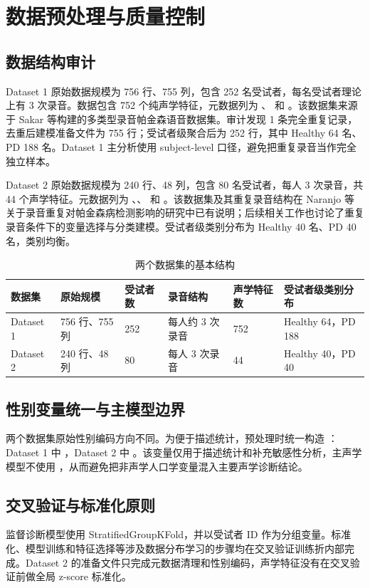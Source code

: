 \section{数据预处理与质量控制}

\subsection{数据结构审计}

Dataset 1 原始数据规模为 756 行、755 列，包含 252 名受试者，每名受试者理论上有 3 次录音。数据包含 752 个纯声学特征，元数据列为 、 和 。该数据集来源于 Sakar 等构建的多类型录音帕金森语音数据集。审计发现 1 条完全重复记录，去重后建模准备文件为 755 行；受试者级聚合后为 252 行，其中 Healthy 64 名、PD 188 名。Dataset 1 主分析使用 subject-level 口径，避免把重复录音当作完全独立样本。

Dataset 2 原始数据规模为 240 行、48 列，包含 80 名受试者，每人 3 次录音，共 44 个声学特征。元数据列为 、、 和 。该数据集及其重复录音结构在 Naranjo 等关于录音重复对帕金森病检测影响的研究中已有说明；后续相关工作也讨论了重复录音条件下的变量选择与分类建模。受试者级类别分布为 Healthy 40 名、PD 40 名，类别均衡。

\begin{table}[H]
\centering
\caption{两个数据集的基本结构}
\begin{tabularx}{\textwidth}{lYYYYY}
\toprule
数据集 & 原始规模 & 受试者数 & 录音结构 & 声学特征数 & 受试者级类别分布 \\
\midrule
Dataset 1 & 756 行、755 列 & 252 & 每人约 3 次录音 & 752 & Healthy 64，PD 188 \\
Dataset 2 & 240 行、48 列 & 80 & 每人 3 次录音 & 44 & Healthy 40，PD 40 \\
\bottomrule
\end{tabularx}
\end{table}

\subsection{性别变量统一与主模型边界}

两个数据集原始性别编码方向不同。为便于描述统计，预处理时统一构造 ：Dataset 1 中 ，Dataset 2 中 。该变量仅用于描述统计和补充敏感性分析，主声学模型不使用 ，从而避免把非声学人口学变量混入主要声学诊断结论。

\subsection{交叉验证与标准化原则}

监督诊断模型使用 StratifiedGroupKFold，并以受试者 ID 作为分组变量。标准化、模型训练和特征选择等涉及数据分布学习的步骤均在交叉验证训练折内部完成。Dataset 2 的准备文件只完成元数据清理和性别编码，声学特征没有在交叉验证前做全局 z-score 标准化。

